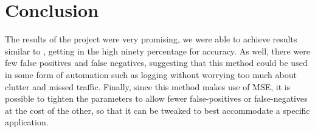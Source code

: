 \documentclass[conference,12pt]{IEEEtran}
\begin{document}
\section{Conclusion}
The results of the project were very promising, we were able to achieve results similar to \parencite{cite:Tree-Based-Models}, getting in the high ninety percentage for accuracy. As well, there were few false positives and false negatives, suggesting that this method could be used in some form of automation such as logging without worrying too much about clutter and missed traffic. Finally, since this method makes use of MSE, it is possible to tighten the parameters to allow fewer false-positives or false-negatives at the cost of the other, so that it can be tweaked to best accommodate a specific application.

\printbibliography
\end{document}

